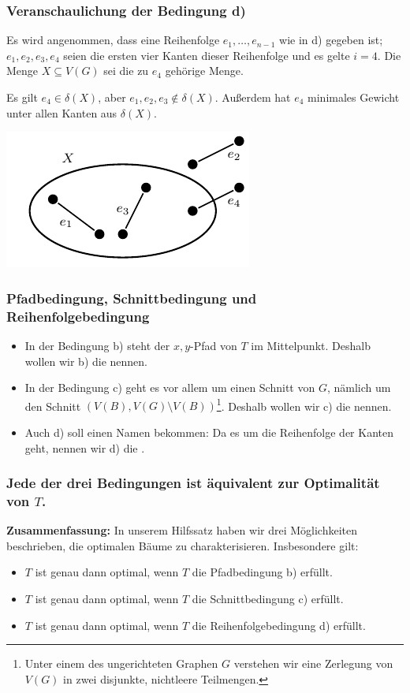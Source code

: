 \documentclass[smaller]{beamer}
\begin{document}
\begin{frame}
\frametitle{Veranschaulichung der Bedingung d)}
 Es wird angenommen, dass eine Reihenfolge $e_1,\ldots,e_{n-1}$ wie in d) gegeben ist; $e_1,e_2,e_3,e_4$ seien die ersten vier Kanten dieser Reihenfolge und es gelte $i=4$. Die Menge $X \subseteq V(G)$ sei die zu $e_4$ gehörige Menge. \\ \vspace*{0.2cm}
 
 Es gilt $e_4 \in \delta(X)$, aber $e_1,e_2,e_3 \notin \delta(X)$. Außerdem hat $e_4$ minimales Gewicht unter allen Kanten aus $\delta(X)$.
 
\begin{center}
 \includegraphics{fig85.pdf}
\end{center}
\end{frame}

\begin{frame}
\frametitle{Pfadbedingung, Schnittbedingung und Reihenfolgebedingung}
\begin{itemize}
\item In der Bedingung b) steht der $x,y$-Pfad von $T$ im Mittelpunkt. Deshalb wollen wir b) die  nennen. 
\item In der Bedingung c) geht es vor allem um einen Schnitt von $G$, nämlich um den Schnitt $(V(B), V(G) \setminus V(B))$\footnote{Unter einem  des ungerichteten Graphen $G$ verstehen wir eine Zerlegung von $V(G)$ in zwei disjunkte, nichtleere Teilmengen.}. Deshalb wollen wir c) die  nennen. 
\item Auch d) soll einen Namen bekommen: Da es um die Reihenfolge der Kanten geht, nennen wir d) die .
\end{itemize}
\end{frame}

\begin{frame}
\frametitle{Jede der drei Bedingungen ist äquivalent zur Optimalität von $T$.}
\textbf{Zusammenfassung:} In unserem Hilfssatz haben wir drei Möglichkeiten beschrieben, die optimalen Bäume zu charakterisieren. Insbesondere gilt:
\begin{itemize}
	\item $T$ ist genau dann optimal, wenn $T$ die \alert{Pfadbedingung} b) erfüllt.
	\item $T$ ist genau dann optimal, wenn $T$ die \alert{Schnittbedingung} c) erfüllt.
	\item $T$ ist genau dann optimal, wenn $T$ die \alert{Reihenfolgebedingung} d) erfüllt.
\end{itemize}
\end{frame}
\end{document}
